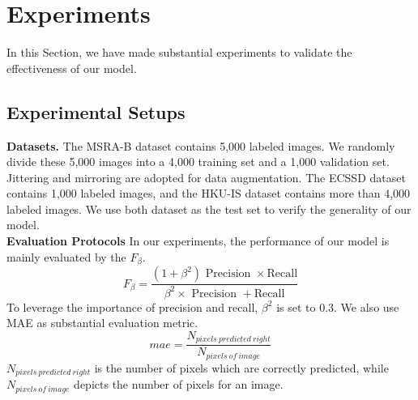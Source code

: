 \documentclass[10pt,journal, compsoc]{IEEEtran}
\begin{document}
\section{Experiments}
In this Section, we have made substantial experiments to validate the effectiveness of our model.
\subsection{Experimental Setups}
\noindent\textbf{Datasets.}
The MSRA-B dataset contains 5,000 labeled images. We randomly divide these 5,000 images into a 4,000 training set and a 1,000 validation set. Jittering and mirroring are adopted for data augmentation.
The ECSSD dataset contains 1,000 labeled images, and the HKU-IS dataset contains more than 4,000 labeled images. We use both dataset as the test set to verify the generality of our model.\\
\noindent\textbf{Evaluation Protocols}
In our experiments, the performance of our model is mainly evaluated by the $F_\beta$.
\begin{equation}
F _ { \beta } = \frac { \left( 1 + \beta ^ { 2 } \right) \text { Precision } \times \text {Recall} } { \beta ^ { 2 } \times \text { Precision } + \text {Recall} }
\end{equation}
To leverage the importance of precision and recall, $\beta ^2$ is set to $0.3$.
We also use MAE as substantial evaluation metric. $$mae=\frac{N_{pixels\ predicted\ right}}{N_{pixels\ of\ image}}$$
$N_{pixels\ predicted\ right}$ is the number of pixels which are correctly predicted, while $N_{pixels\ of\ image}$ depicts the number of pixels for an image.
\end{document}
